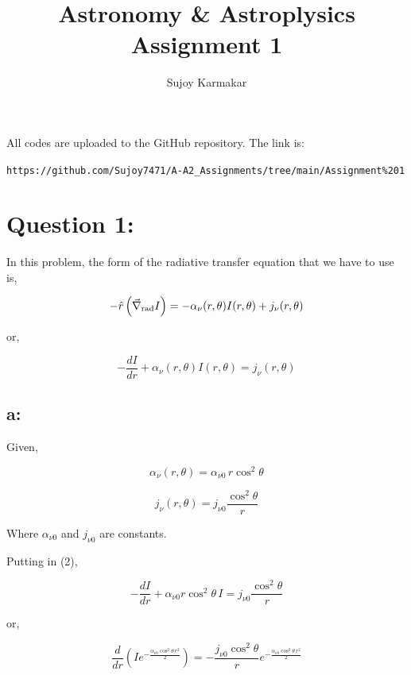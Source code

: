 \documentclass{article}
\title{Astronomy \& Astroplysics Assignment 1}
\author{Sujoy Karmakar}
\begin{document}
\maketitle

All codes are uploaded to the GitHub repository. The link is:


\verb|https://github.com/Sujoy7471/A-A2_Assignments/tree/main/Assignment%201|


\section{Question 1:}
In this problem, the form of the radiative transfer equation that we have to use is,

\begin{equation}
-\hat{r}\left(\vec{\nabla}_{\rm rad} I \right)
= -\alpha_\nu(r,\theta) I(r,\theta) + j_\nu(r,\theta)
\end{equation}

or,

\begin{equation}
-\frac{dI}{dr} + \alpha_\nu(r,\theta) I(r,\theta) = j_\nu(r,\theta)
\end{equation}

\subsection{a:}
 Given,

\begin{equation}
\alpha_\nu(r,\theta) = \alpha_{\nu 0}\, r \cos^2\theta
\end{equation}

\begin{equation}
j_\nu(r,\theta) = j_{\nu 0}\frac{\cos^2\theta}{r}
\end{equation}

Where $\alpha_{\nu 0}$ and $j_{\nu 0}$ are constants.

Putting in (2),

\begin{equation}
-\frac{dI}{dr} + \alpha_{\nu 0} r \cos^2\theta\, I
= j_{\nu 0}\frac{\cos^2\theta}{r}
\end{equation}

or,

\begin{equation}
\frac{d}{dr}
\left(
I e^{-\frac{\alpha_{\nu 0}\cos^2\theta\, r^2}{2}}
\right)
=
-\frac{j_{\nu 0}\cos^2\theta}{r}
e^{-\frac{\alpha_{\nu 0}\cos^2\theta\, r^2}{2}}
\end{equation}
\end{document}
